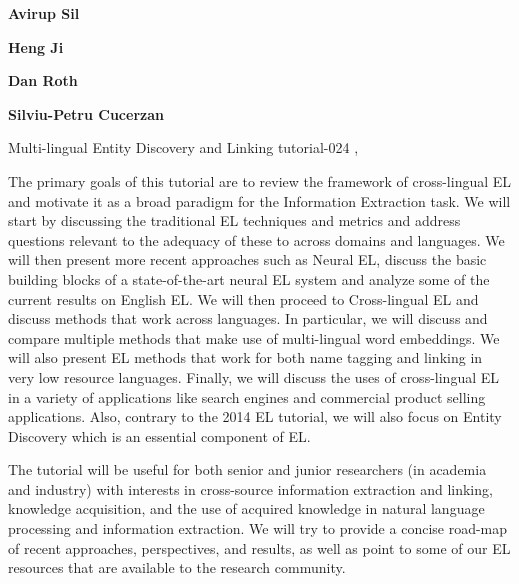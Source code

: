 \begin{bio}
{\bfseries Avirup Sil} 

{\bfseries Heng Ji}

{\bfseries Dan Roth}

{\bfseries Silviu-Petru Cucerzan}

\end{bio}

\begin{tutorial}{Multi-lingual Entity Discovery and Linking}
  {tutorial-024}
  {\daydateyear, \tutorialafternoontime}
  {\TutLocH}


The primary goals of this tutorial are to review the framework of cross-lingual EL and motivate it as a broad paradigm for the Information Extraction task. We will start by discussing the traditional EL techniques and metrics and address questions relevant to the adequacy of these to across domains and languages. We will then present more recent approaches such as Neural EL, discuss the basic building blocks of a state-of-the-art neural EL system and analyze some of the current results on English EL. We will then proceed to Cross-lingual EL and discuss methods that work across languages. In particular, we will discuss and compare multiple methods that make use of multi-lingual word embeddings. We will also present EL methods that work for both name tagging and linking in very low resource languages. Finally, we will discuss the uses of cross-lingual EL in a variety of applications like search engines and commercial product selling applications. Also, contrary to the 2014 EL tutorial, we will also focus on Entity Discovery which is an essential component of EL.

The tutorial will be useful for both senior and junior researchers (in academia and industry) with interests in cross-source information extraction and linking, knowledge acquisition, and the use of acquired knowledge in natural language processing and information extraction. We will try to provide a concise road-map of recent approaches, perspectives, and results, as well as point to some of our EL resources that are available to the research community.

\end{tutorial}
